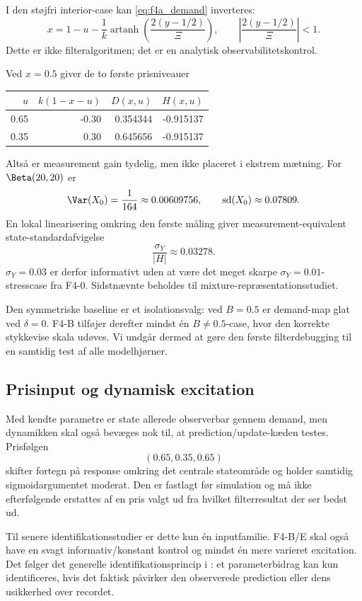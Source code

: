 I den støjfri interior-case kan \cref{eq:f4a_demand} inverteres:
\begin{equation}
 x
 =1-u-\frac1k
 \operatorname{artanh}\!\left(\frac{2(y-1/2)}{\Xi}\right),
 \qquad
 \left|\frac{2(y-1/2)}{\Xi}\right|<1.
 \label{eq:f4a_inverse}
\end{equation}
Dette er ikke filteralgoritmen; det er en analytisk observabilitetskontrol.

Ved \(x=0.5\) giver de to første prisniveauer
\begin{center}
\begin{tabular}{@{}rrrr@{}}
\toprule
\(u\) & \(k(1-x-u)\) & \(D(x,u)\) & \(H(x,u)\)\\
\midrule
0.65 & -0.30 & 0.354344 & -0.915137\\
0.35 &  0.30 & 0.645656 & -0.915137\\
\bottomrule
\end{tabular}
\end{center}
Altså er measurement gain tydelig, men ikke placeret i ekstrem mætning. For
\(\Beta(20,20)\) er
\[
 \Var(X_0)=\frac1{164}\approx0.00609756,
 \qquad \operatorname{sd}(X_0)\approx0.07809.
\]
En lokal linearisering omkring den første måling giver measurement-equivalent
state-standardafvigelse
\[
 \frac{\sigma_Y}{|H|}\approx0.03278.
\]
\(\sigma_Y=0.03\) er derfor informativt uden at være det meget skarpe
\(\sigma_Y=0.01\)-stresscase fra F4-0. Sidstnævnte beholdes til mixture-repræsentationsstudiet.

Den symmetriske baseline er et isolationsvalg: ved \(B=0.5\) er demand-map glat ved
\(\delta=0\). F4-B tilføjer derefter mindst én \(B\ne0.5\)-case, hvor den korrekte
stykkevise skala udøves. Vi undgår dermed at gøre den første filterdebugging til en
samtidig test af alle modelhjørner.

\subsection{Prisinput og dynamisk excitation}

Med kendte parametre er state allerede observerbar gennem demand, men dynamikken skal
også bevæges nok til, at prediction/update-kæden testes. Prisfølgen
\[
 (0.65,0.35,0.65)
\]
skifter fortegn på response omkring det centrale stateområde og holder samtidig
sigmoidargumentet moderat. Den er fastlagt før simulation og må ikke efterfølgende
erstattes af en pris valgt ud fra hvilket filterresultat der ser bedst ud.

Til senere identifikationsstudier er dette kun én inputfamilie. F4-B/E skal også have
en svagt informativ/konstant kontrol og mindst én mere varieret excitation. Det følger
det generelle identifikationsprincip i \cite{alba}: et parameterbidrag kan kun
identificeres, hvis det faktisk påvirker den observerede prediction eller dens
usikkerhed over recordet.

